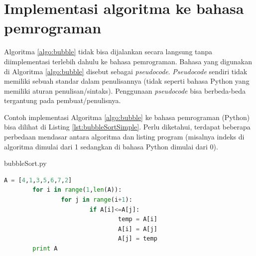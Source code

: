 \section{Implementasi algoritma ke bahasa pemrograman}
Algoritma \ref{algo:bubble} tidak bisa dijalankan secara langsung tanpa diimplementasi terlebih dahulu ke bahasa pemrograman. Bahasa yang digunakan di Algoritma \ref{algo:bubble} disebut sebagai \textit{pseudocode}. \textit{Pseudocode} sendiri tidak memiliki sebuah standar dalam penulisannya (tidak seperti bahasa Python yang memiliki aturan penulisan/sintaks). Penggunaan \textit{pseudocode} bisa berbeda-beda tergantung pada pembuat/penulisnya. 

Contoh implementasi Algoritma \ref{algo:bubble} ke bahasa pemrograman (Python) bisa dilihat di Listing \ref{lst:bubbleSortSimple}. Perlu diketahui, terdapat beberapa perbedaan mendasar antara algoritma dan listing program (misalnya indeks di algoritma dimulai dari 1 sedangkan di bahasa Python dimulai dari 0). 

\begin{listprog}{bubbleSort.py}
	\label{lst:bubbleSortSimple}
	\begin{lstlisting}[language=Python]
		A = [4,1,3,5,6,7,2]
		for i in range(1,len(A)):
				for j in range(i+1):
						if A[i]<=A[j]:
								temp = A[i]
								A[i] = A[j]
								A[j] = temp
		print A
	\end{lstlisting}
\end{listprog}

		

